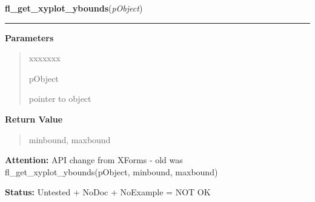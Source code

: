 \hspace{.8\funcindent}\begin{boxedminipage}{\funcwidth}

    \raggedright \textbf{fl\_get\_xyplot\_ybounds}(\textit{pObject})

    \vspace{-1.5ex}

    \rule{\textwidth}{0.5\fboxrule}
\setlength{\parskip}{2ex}
\setlength{\parskip}{1ex}
      \textbf{Parameters}
      \vspace{-1ex}

      \begin{quote}
        \begin{Ventry}{xxxxxxx}

          \item[pObject]

          pointer to object

        \end{Ventry}

      \end{quote}

      \textbf{Return Value}
    \vspace{-1ex}

      \begin{quote}
      minbound, maxbound

      \end{quote}

\textbf{Attention:} API change from XForms - old was fl\_get\_xyplot\_ybounds(pObject, 
minbound, maxbound)



\textbf{Status:} Untested + NoDoc + NoExample = NOT OK



    \end{boxedminipage}

    \label{xformslib:library:fl_get_xyplot}

    \vspace{0.5ex}

